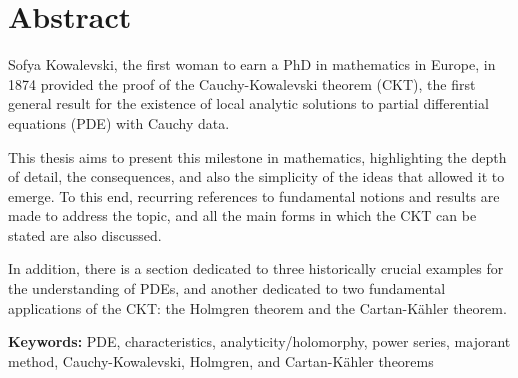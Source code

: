 \chapter*{Abstract}

Sofya Kowalevski, the first woman to earn a PhD in mathematics in Europe, in 1874 provided the proof of the Cauchy-Kowalevski theorem (CKT), the first general result for the existence of local analytic solutions to partial differential equations (PDE) with Cauchy data.

\vspace{6mm}
This thesis aims to present this milestone in mathematics, highlighting the depth of detail, the consequences, and also the simplicity of the ideas that allowed it to emerge. To this end, recurring references to fundamental notions and results are made to address the topic, and all the main forms in which the CKT can be stated are also discussed.

\vspace{6mm}
In addition, there is a section dedicated to three historically crucial examples for the understanding of PDEs, and another dedicated to two fundamental applications of the CKT: the Holmgren theorem and the Cartan-Kähler theorem.

\vspace{6mm}
\textbf{Keywords:} PDE, characteristics, analyticity/holomorphy, power series, majorant method, Cauchy-Kowalevski, Holmgren, and Cartan-Kähler theorems

\newpage
\blankpage
